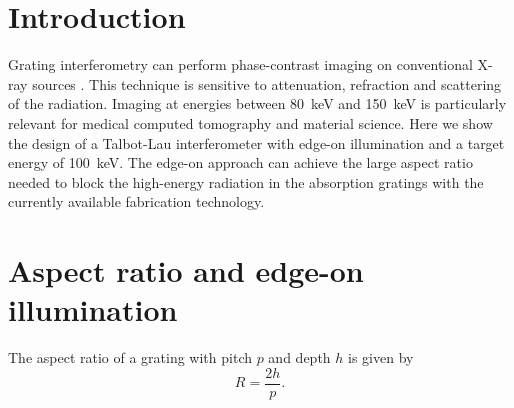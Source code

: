 \documentclass[a0,portrait]{a0poster}
\begin{document}

\begin{multicols}{2} %


\color{Navy} %

\thispagestyle{empty}
\section*{Introduction}
Grating interferometry \cite{David2002} can perform phase-contrast imaging on
    conventional X-ray sources \cite{Pfeiffer2006}. This technique is sensitive to attenuation,
    refraction and scattering of the radiation.
    Imaging at energies between \SI{80}{\kilo\eV} and \SI{150}{\kilo\eV} is
    particularly relevant for medical computed tomography and material
    science.
    Here we show the design of a Talbot-Lau interferometer with edge-on
    illumination and a target energy of \SI{100}{\kilo\eV}. The edge-on
    approach can achieve the large aspect ratio needed to block the
    high-energy radiation in the absorption gratings with the
    currently available fabrication technology.


\color{DarkSlateGray} %

\section*{Aspect ratio and edge-on illumination}
The aspect ratio of a grating with pitch $p$ and depth $h$ is given by
\vspace{.5\baselineskip}
\begin{equation*}
    R = \frac{2h}{p}.
\end{equation*}
\vspace{.5\baselineskip}


\end{multicols}
\end{document}
